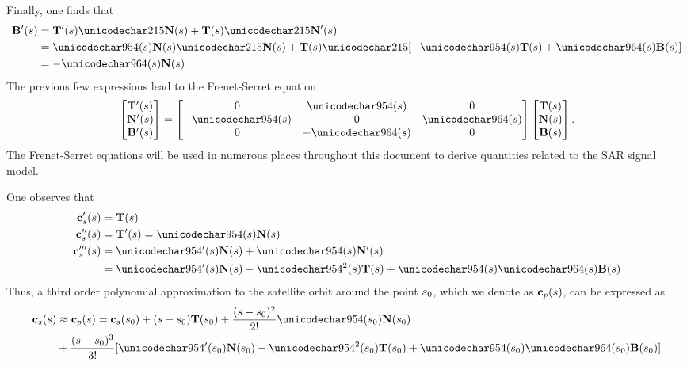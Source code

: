 Finally, one finds that
\begin{equation}
\begin{split}
 \vct{B}'(\parm) &= \vct{T}'(\parm)\times\vct{N}(\parm) + \vct{T}(\parm)\times\vct{N}'(\parm)\\
 &=\kappa(\parm)\vct{N}(\parm)\times\vct{N}(\parm) + \vct{T}(\parm)\times[-\kappa(\parm)\vct{T}(\parm)+\tau(\parm)\vct{B}(\parm)]\\
 &=-\tau(\parm)\vct{N}(\parm)
 \end{split}
\end{equation}
The previous few expressions lead to the Frenet-Serret equation
\begin{equation}
 \begin{bmatrix}\vct{T}'(\parm)\\\vct{N}'(\parm)\\\vct{B}'(\parm)\end{bmatrix}
 =
 \begin{bmatrix}
  0 &\kappa(\parm)& 0\\
  -\kappa(\parm)& 0 &\tau(\parm)\\
  0 &-\tau(\parm)& 0
 \end{bmatrix}
 \begin{bmatrix}\vct{T}(\parm)\\\vct{N}(\parm)\\\vct{B}(\parm)\end{bmatrix}.
 \label{eq:FrenetSerret}
\end{equation}
The Frenet-Serret equations will be used in numerous places throughout this document to derive quantities related to the SAR signal model.
\par
One observes that
\begin{equation}
\begin{split}
 \sats'(\parm) &= \vct{T}(\parm)\\
 \sats''(\parm) &= \vct{T}'(\parm) = \kappa(\parm)\vct{N}(\parm)\\
 \sats'''(\parm) &= \kappa'(\parm)\vct{N}(\parm) + \kappa(\parm)\vct{N}'(\parm)\\
 &= \kappa'(\parm)\vct{N}(\parm) -\kappa^2(\parm)\vct{T}(\parm)+\kappa(\parm)\tau(\parm)\vct{B}(\parm)
\end{split}
\end{equation}
Thus, a third order polynomial approximation to the satellite orbit around the point $s_0$, which we denote as $\mathbf{c}_p(s)$, can be expressed as
\begin{equation}
\begin{split}
 \sats(\parm)&\approx\satp(\parm) = \sats(\parm_0) + (s-\parm_0)\vct{T}(\parm_0) + \frac{(s-\parm_0)^2}{2!}\kappa(\parm_0)\vct{N}(\parm_0)\\
 &+ \frac{(s-\parm_0)^3}{3!}[\kappa'(\parm_0)\vct{N}(\parm_0) -\kappa^2(\parm_0)\vct{T}(\parm_0)+\kappa(\parm_0)\tau(\parm_0)\vct{B}(\parm_0)]
\end{split}
\end{equation}
